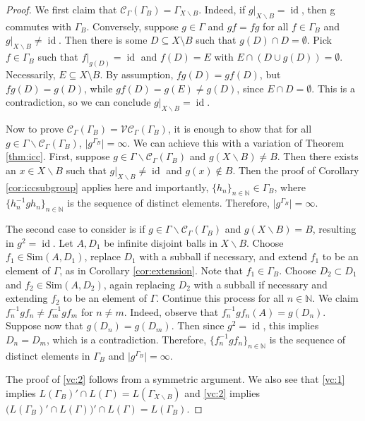 \documentclass[12pt]{amsart}
\numberwithin{equation}{subsection}
\theoremstyle{definition}
\theoremstyle{definition}
\theoremstyle{remark}
\begin{document}
\begin{proof}
    We first claim that $\mathcal{C}_\Gamma(\Gamma_B) = \Gamma_{X\backslash B}$. Indeed, if $g\vert_{X \backslash B} =\operatorname{id}$, then g commutes with $\Gamma_B$. Conversely, suppose $g \in \Gamma$ and $gf=fg$ for all $f \in \Gamma_B$ and $g\vert_{X \backslash B} \neq \operatorname{id}$. Then there is some $D \subseteq X \setminus B$ such that $g(D) \cap D = \emptyset$. Pick $f \in \Gamma_B$ such that $f\vert_{g(D)} = \operatorname{id}$ and $f(D) =E$ with $E \cap (D\cup g(D)) = \emptyset$. Necessarily, $E \subseteq X \setminus B$. By assumption, $fg(D) =gf(D)$, but $fg(D) =g(D)$, while $gf(D) = g(E) \neq g(D)$, since $E \cap D = \emptyset$. This is a contradiction, so we can conclude $g\vert_{X \backslash B} = \operatorname{id}$. 
 
    Now to prove $\mathcal{C}_\Gamma(\Gamma_B)  = \mathcal{VC}_\Gamma(\Gamma_B)$, it is enough to show that for all $g \in \Gamma \backslash \mathcal{C}_\Gamma(\Gamma_B)$, $ \vert g^{\Gamma_B}\vert = \infty$. We can achieve this with a variation of Theorem \ref{thm:icc}. First, suppose $g \in \Gamma \backslash \mathcal C_\Gamma(\Gamma_B)$ and $g(X\backslash B) \neq B$. Then there exists an $x \in X \backslash B$ such that  $g\vert_{X\backslash B} \neq \operatorname{id}$ and $g(x) \not \in B$. Then the proof of Corollary \ref{cor:iccsubgroup} applies here and importantly, $\{h_n\}_{n \in \mathbb N} \in \Gamma_B$, where $\{h_n^{-1}gh_n\}_{n \in \mathbb N}$ is the sequence of distinct elements. Therefore, $\vert g^{\Gamma_B}\vert = \infty$. 

    The second case to consider is if $g \in \Gamma \backslash \mathcal C_\Gamma(\Gamma_B)$ and $g(X \backslash B) = B$, resulting in $g^2=\operatorname{id}$. Let $A, D_1$ be infinite disjoint balls in $X \backslash B$. Choose $f_1 \in \text{Sim}(A,D_1)$, replace $D_1$ with a subball if necessary, and extend $f_1$ to be an element of $\Gamma$, as in Corollary \ref{cor:extension}. Note that $f_1 \in \Gamma_B$. Choose $D_2 \subset D_1$ and $f_2 \in \text{Sim}(A,D_2)$, again replacing $D_2$ with a subball if necessary and extending $f_2$ to be an element of $\Gamma$. Continue this process for all $n \in \mathbb N$. We claim $f_n^{-1}gf_n \neq f_m^{-1}gf_m$ for $n \neq m$. Indeed, observe that $f_n^{-1}gf_n(A) = g(D_n)$. Suppose now that $g(D_n) = g(D_m)$. Then since $g^2=\operatorname{id}$, this implies $D_n = D_m$, which is a contradiction. Therefore, $\{f_n^{-1}gf_n\}_{n \in \mathbb N}$ is the sequence of distinct elements in $\Gamma_B$ and $\vert g^{\Gamma_B}\vert = \infty$.

    
    The proof of \eqref{vc:2} follows from a symmetric argument. We also see that \eqref{vc:1} implies $L(\Gamma_B)'\cap L(\Gamma) = L(\Gamma_{X \backslash B})$ and \eqref{vc:2} implies 
    $\big(L(\Gamma_B)'\cap L(\Gamma)\big)'\cap L(\Gamma) = L(\Gamma_B)$.

    
\end{proof}
\end{document}
